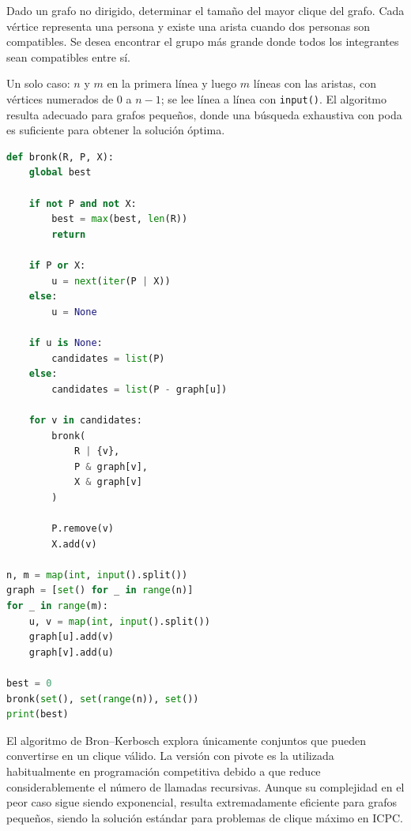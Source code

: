 
Dado un grafo no dirigido, determinar el tamaño del mayor clique del grafo. Cada vértice representa una persona y existe una arista cuando dos personas son compatibles. Se desea encontrar el grupo más grande donde todos los integrantes sean compatibles entre sí.

 Un solo caso: $n$ y $m$ en la primera línea y luego $m$ líneas con las aristas, con vértices numerados de 0 a $n-1$; se lee línea a línea con \texttt{input()}. El algoritmo resulta adecuado para grafos pequeños, donde una búsqueda exhaustiva con poda es suficiente para obtener la solución óptima.


\begin{lstlisting}[language=Python]
def bronk(R, P, X):
    global best

    if not P and not X:
        best = max(best, len(R))
        return

    if P or X:
        u = next(iter(P | X))
    else:
        u = None

    if u is None:
        candidates = list(P)
    else:
        candidates = list(P - graph[u])

    for v in candidates:
        bronk(
            R | {v},
            P & graph[v],
            X & graph[v]
        )

        P.remove(v)
        X.add(v)

n, m = map(int, input().split())
graph = [set() for _ in range(n)]
for _ in range(m):
    u, v = map(int, input().split())
    graph[u].add(v)
    graph[v].add(u)

best = 0
bronk(set(), set(range(n)), set())
print(best)
\end{lstlisting}

 El algoritmo de Bron--Kerbosch explora únicamente conjuntos que pueden convertirse en un clique válido. La versión con pivote es la utilizada habitualmente en programación competitiva debido a que reduce considerablemente el número de llamadas recursivas. Aunque su complejidad en el peor caso sigue siendo exponencial, resulta extremadamente eficiente para grafos pequeños, siendo la solución estándar para problemas de clique máximo en ICPC.
